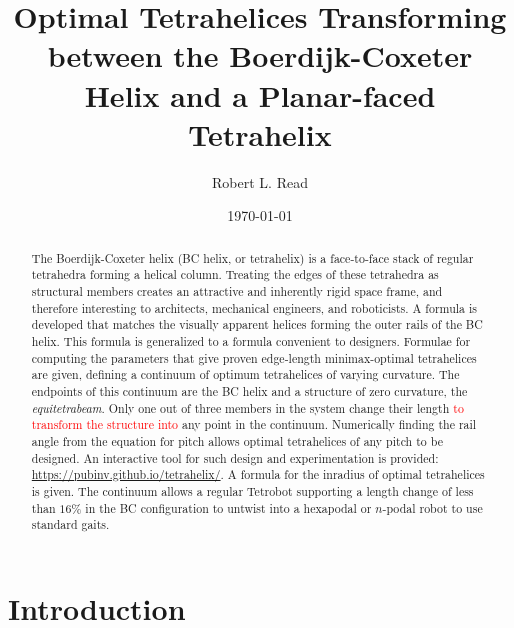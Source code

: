 \documentclass[twocolumn,10pt]{asme2ej}
\title{Optimal Tetrahelices Transforming between the Boerdijk-Coxeter Helix and a Planar-faced Tetrahelix}
\author{Robert L. Read
  \affiliation{
    Founder, Public Invention \\
    Austin, TX, 78704 \\
    Email: \href{mailto:read.robert@gmail.com}{read.robert@gmail.com} 
    }
}
\date{\today}
\newcommand{\highlighttext}[1] {\textcolor{red}{#1}}
\begin{document}
\maketitle



\begin{abstract}
  The Boerdijk-Coxeter helix (BC helix, or tetrahelix) is a
  face-to-face stack of regular tetrahedra forming a helical column.  Treating the edges of
  these tetrahedra as structural members creates an attractive and
  inherently rigid space frame, and therefore interesting to architects,
  mechanical engineers, and roboticists.  A formula is developed that matches the
  visually apparent helices forming the outer rails of the BC helix.
  This formula is generalized to a formula convenient to designers.
  Formulae for 
  computing the
  parameters that give proven edge-length minimax-optimal tetrahelices
  are given, defining a continuum of optimum tetrahelices of varying curvature.
  The endpoints of this continuum are the BC helix and
  a structure of zero curvature, the \emph{equitetrabeam}.
 Only one out of three members in the system change their length \highlighttext{ to transform
  the structure into }
  any point in the continuum.
  Numerically finding the rail angle from the equation for
  pitch allows optimal tetrahelices of any pitch to be designed. 
  An interactive tool for such design and experimentation is provided: \url{https://pubinv.github.io/tetrahelix/}.
  A formula for the inradius of optimal tetrahelices is given.
  The continuum allows a regular Tetrobot supporting a length change of less than $16\%$ in the
  BC configuration to untwist into a hexapodal or $n$-podal robot
  to use standard gaits.
\end{abstract}






\section{Introduction}
\end{document}
